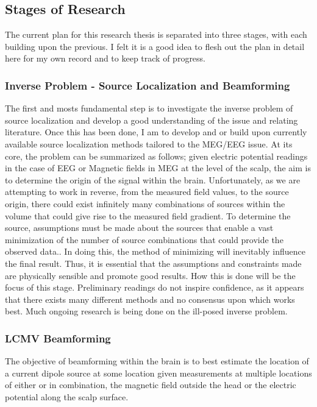 \documentclass{article}
\begin{document}

\subsection{Stages of Research}
The current plan for this research thesis is separated into three stages, with each building upon the previous. I felt it is a good idea to flesh out the plan in detail here for my own record and to keep track of progress.
\subsubsection{Inverse Problem - Source Localization and Beamforming}
The first and mosts fundamental step is to investigate the inverse problem of source localization and develop a good understanding of the issue and relating literature. Once this has been done, I am to develop and or build upon currently available source localization methods tailored to the MEG/EEG issue. At its core, the problem can be summarized as follows; given electric potential readings in the case of EEG or Magnetic fields in MEG at the level of the scalp, the aim is to determine the origin of the signal within the brain. Unfortunately, as we are attempting to work in reverse, from the measured field values, to the source origin, there could exist infinitely many combinations of sources within the volume that could give rise to the measured field gradient. To determine the source, assumptions must be made about the sources that enable a vast minimization of the number of source combinations that could provide the observed data.. In doing this, the method of minimizing will inevitably influence the final result. Thus, it is essential that the assumptions and constraints made are physically sensible and promote good results. How this is done will be the focus of this stage. Preliminary readings do not inspire confidence, as it appears that there exists many different methods and no consensus upon which works best. Much ongoing research is being done on the ill-posed inverse problem.

\subsubsection{LCMV Beamforming}
The objective of beamforming within the brain is to best estimate the location of a current dipole source at some location given measurements at multiple locations of either or in combination, the magnetic field outside the head or the electric potential along the scalp surface.
\end{document}
